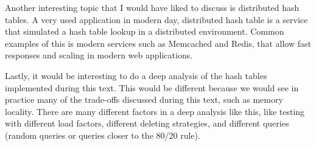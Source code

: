 Another interesting topic that I would have liked to discuss is distributed hash tables. A very used application in modern day, distributed hash table is a service that simulated a hash table lookup in a distributed environment. Common examples of this is modern services such as Memcached and Redis, that allow fast responses and scaling in modern web applications.

Lastly, it would be interesting to do a deep analysis of the hash tables implemented during this text. This would be different because we would see in practice many of the trade-offs discussed during this text, such as memory locality. There are many different factors in a deep analysis like this, like testing with different load factors, different deleting strategies, and different queries (random queries or queries closer to the 80/20 rule).
